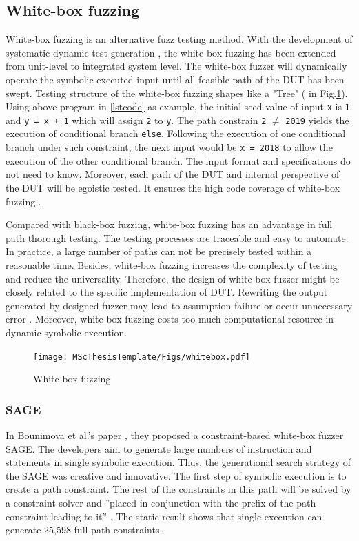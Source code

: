 \subsection{White-box fuzzing}
White-box fuzzing is an alternative fuzz testing method. With the development of systematic dynamic test generation \cite{godefroid2005dart}, the white-box fuzzing has been extended from unit-level to integrated system level. The white-box fuzzer will dynamically operate the symbolic executed input until all feasible path of the DUT has been swept. Testing structure of the white-box fuzzing shapes like a "Tree" ( in Fig.\ref{fig:whitebox}). Using above program in \ref{lstcode} as example, the initial seed value of input \texttt{x} is \texttt{1} and \texttt{y = x + 1} which will assign \texttt{2} to \texttt{y}. The path constrain \texttt{2} $\neq$ \texttt{2019} yields the execution of conditional branch \texttt{else}. Following the execution of one conditional branch under such constraint, the next input would be \texttt{x = 2018} to allow the execution of the other conditional branch. The input format and specifications do not need to know. Moreover, each path of the DUT and internal perspective of the DUT will be egoistic tested. It ensures the high code coverage of white-box fuzzing \cite{functest}.

Compared with black-box fuzzing, white-box fuzzing has an advantage in full path thorough testing. The testing processes are traceable and easy to automate. In practice, a large number of paths can not be precisely tested within a reasonable time. Besides, white-box fuzzing increases the complexity of testing and reduce the universality. Therefore, the design of white-box fuzzer might be closely related to the specific implementation of DUT. Rewriting the output generated by designed fuzzer may lead to assumption failure or occur unnecessary error \cite{nidhra2012black}\cite{bounimova2013billions}. Moreover, white-box fuzzing costs too much computational resource in dynamic symbolic execution. 

\begin{figure}[htb]
    \centering
    \texttt{[image: MScThesisTemplate/Figs/whitebox.pdf]}
    \caption{\footnotesize White-box fuzzing}
    \label{fig:whitebox}
\end{figure}
\subsubsection{SAGE}
In Bounimova et al.'s paper \cite{bounimova2013billions}, they proposed a constraint-based white-box fuzzer SAGE. The developers aim to generate large numbers of instruction and statements in single symbolic execution. Thus, the generational search strategy of the SAGE was creative and innovative. The first step of symbolic execution is to create a path constraint. The rest of the constraints in this path will be solved by a constraint solver and ''placed in conjunction with the prefix of the path constraint leading to it'' \cite{bounimova2013billions}. The static result shows that single execution can generate 25,598 full path constraints.

